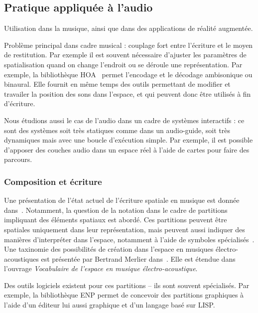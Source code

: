 \documentclass[french,12pt]{article}
\begin{document}
\subsection{Pratique appliquée à l'audio}
Utilisation dans la musique, ainsi que dans des applications de réalité augmentée.

Problème principal dans cadre musical : couplage fort entre l'écriture et le moyen de restitution. Par exemple il est souvent nécessaire d'ajuster les paramètres de spatialisation quand on change l'endroit ou se déroule une représentation. %
Par exemple, la bibliothèque HOA~\cite{colafrancesco_bibliotheque_2013} permet l'encodage et le décodage ambisonique ou binaural. Elle fournit en même temps des outils permettant de modifier et travailer la position des sons dans l'espace, et qui peuvent donc être utilisés à fin d'écriture.

Nous étudions aussi le cas de l'audio dans un cadre de systèmes interactifs : ce sont des systèmes soit très statiques comme dans un audio-guide, soit très dynamiques mais avec une boucle d'exécution simple.
Par exemple, il est possible d'apposer des couches audio dans un espace réel à l'aide de cartes pour faire des parcours\cite{lemordant_augmented_2010}. 


\subsubsection{Composition et écriture}
Une présentation de l'état actuel de l'écriture spatiale en musique est donnée dans~\cite{fober_les_2015}. Notamment, la question de la notation dans le cadre de partitions impliquant des éléments spatiaux est abordé. %
Ces partitions peuvent être spatiales uniquement dans leur représentation, mais peuvent aussi indiquer des manières d'interpréter dans l'espace, notamment à l'aide de symboles spécialisés~\cite{ellberger_spatialization_2014}. Une taxinomie des possibilités de création dans l'espace en musiques électro-acoustiques est présentée par Bertrand Merlier dans~\cite{merlier_vocabulaire_2006}. Elle est étendue dans l'ouvrage \textit{Vocabulaire de l'espace en musique électro-acoustique\cite{merlier_vocabulaire_2006_book}}.

Des outils logiciels existent pour ces partitions -- ils sont souvent spécialisés. Par exemple, la bibliothèque \ac{ENP}\cite{kuuskankare_expressive_2006} permet de concevoir des partitions graphiques à l'aide d'un éditeur lui aussi graphique et d'un langage basé sur LISP.
\end{document}
